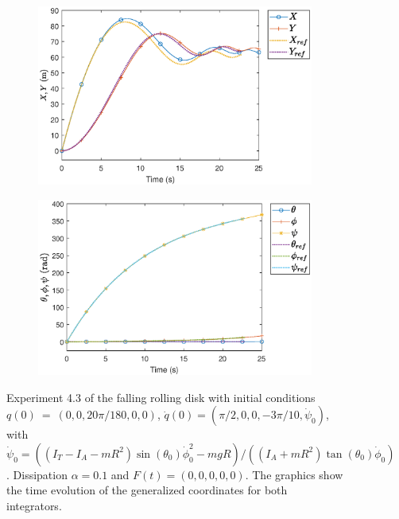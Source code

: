 \documentclass{aims}
\numberwithin{equation}{section}
\theoremstyle{definition}
\begin{document}
\begin{figure}
  \centering
  \begin{subfigure}[b]{0.75\textwidth}
    \centering
    \includegraphics[width=\textwidth]{fig/43XY.eps}
  \end{subfigure}
  \par\bigskip
  \begin{subfigure}[b]{0.75\textwidth}
    \centering
    \includegraphics[width=\textwidth]{fig/43thetaphipsi.eps}
  \end{subfigure}
  \caption{Experiment 4.3 of the falling rolling disk with initial conditions $q(0)~=~(0,0,20\pi/180,0,0)$, $\dot{q}(0) = (\pi/2,0,0,-3\pi/10,\dot{\psi}_0)$, with $\dot{\psi}_0 = ((I_T - I_A - m R^2) \sin(\theta_0) \dot{\phi}_0^2 - m g R)/((I_A + m R^2) \tan(\theta_0) \dot{\phi}_0)$. Dissipation $\alpha = 0.1$ and $F(t) = (0,0,0,0,0)$. The graphics show the time evolution of the generalized coordinates for both integrators.}
  \label{fig:disco_experimento_4_3_1}
\end{figure}
\end{document}
